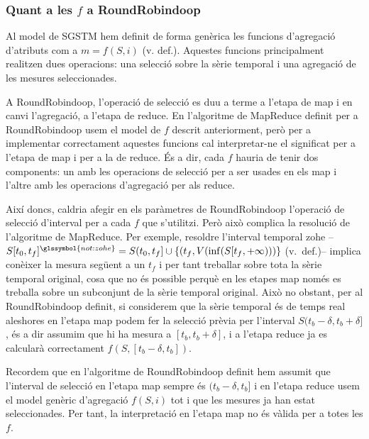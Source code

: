 \subsubsection{Quant a les $f$ a RoundRobindoop}
\label{sec:mapreduce:f}

Al model de \gls{SGSTM} hem definit de forma genèrica les funcions
d'agregació d'atributs com a $m=f(S,i)$ (v. def.). Aquestes funcions
principalment realitzen dues operacions: una selecció sobre la sèrie
temporal i una agregació de les mesures seleccionades. 

A RoundRobindoop, l'operació de selecció es duu a terme a l'etapa de
map i en canvi l'agregació, a l'etapa de reduce.  En l'algoritme de
MapReduce definit per a RoundRobindoop usem el model de $f$ descrit
anteriorment, però per a implementar correctament aquestes funcions
cal interpretar-ne el significat per a l'etapa de map i per a la de
reduce. És a dir, cada $f$ hauria de tenir dos components: un amb les
operacions de selecció per a ser usades en els map i l'altre amb les
operacions d'agregació per als reduce.


Així doncs, caldria afegir en els paràmetres de RoundRobindoop
l'operació de selecció d'interval per a cada $f$ que s'utilitzi. Però
això complica la resolució de l'algoritme de MapReduce. Per exemple,
resoldre l'interval temporal \gls{zohe}
--$S[t_0,t_f]^{\glssymbol{not:zohe}} = S(t_0,t_f] \cup \{
(t_f,V(\inf(S[t_f,+\infty))) \}$ (v.~def.)--
implica conèixer la mesura següent a un $t_f$ i per tant treballar
sobre tota la sèrie temporal original, cosa que no és possible perquè
en les etapes map només es treballa sobre un subconjunt de la sèrie
temporal original. Això no obstant, per al RoundRobindoop definit, si
considerem que la sèrie temporal és de temps real aleshores en l'etapa
map podem fer la selecció prèvia per l'interval
$S(t_b-\delta,t_b+\delta]$, és a dir assumim que hi ha mesura a
$[t_b,t_b+\delta]$, i a l'etapa reduce ja es calcularà correctament
$f(S,[t_b-\delta,t_b])$. 


Recordem que en l'algoritme de RoundRobindoop definit hem assumit que
l'interval de selecció en l'etapa map sempre és $(t_b-\delta,t_b]$ i
en l'etapa reduce usem el model genèric d'agregació $f(S,i)$ tot i que
les mesures ja han estat seleccionades. Per tant, la interpretació en
l'etapa map no és vàlida per a totes les $f$.

